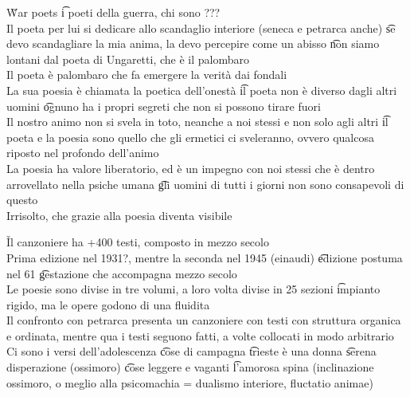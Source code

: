 \documentclass[12pt]{article}
\begin{document}
\v

War poets \t i poeti della guerra, chi sono ??? \\
Il poeta per lui si dedicare allo scandaglio interiore (seneca e petrarca anche) \t se devo scandagliare la mia anima, la devo percepire come un abisso \t non siamo lontani dal poeta di Ungaretti, che è il palombaro \\
Il poeta è palombaro che fa emergere la verità dai fondali \\
La sua poesia è chiamata la poetica dell'onestà \t il poeta non è diverso dagli altri uomini \t ognuno ha i propri segreti che non si possono tirare fuori \\
Il nostro animo non si svela in toto, neanche a noi stessi e non solo agli altri \t il poeta e la poesia sono quello che gli ermetici ci sveleranno, ovvero qualcosa riposto nel profondo dell'animo \\
La poesia ha valore liberatorio, ed è un impegno con noi stessi che è dentro arrovellato nella psiche umana \t gli uomini di tutti i giorni non sono consapevoli di questo \\
Irrisolto, che grazie alla poesia diventa visibile

\v

Il canzoniere ha +400 testi, composto in mezzo secolo \\
Prima edizione nel 1931?, mentre la seconda nel 1945 (einaudi) \t edizione postuma nel 61 \t gestazione che accompagna mezzo secolo \\
Le poesie sono divise in tre volumi, a loro volta divise in 25 sezioni \t impianto rigido, ma le opere godono di una fluidita \\
Il confronto con petrarca presenta un canzoniere con testi con struttura organica e ordinata, mentre qua i testi seguono fatti, a volte collocati in modo arbitrario \\
Ci sono i versi dell'adolescenza \t cose di campagna \t trieste è una donna \t serena disperazione (ossimoro) \t cose leggere e vaganti \t l'amorosa spina (inclinazione ossimoro, o meglio alla psicomachia = dualismo interiore, fluctatio animae)
\end{document}
